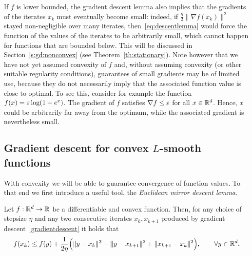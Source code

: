 If $f$ is lower bounded, the gradient descent lemma also implies that the gradients
of the iterates $x_k$ must eventually become small: indeed, if $\frac{\eta}{2}\|\nabla f(x_k)\|^2$ stayed non-negligible over many iterates, then~\eqref{eq:descentlemma} would force the function of the values of the iterates to be arbitrarily small, which cannot happen for functions that are bounded below. This will be discussed in Section~\ref{s:gd:nonconvex} (see Theorem~\ref{th:stationary}). Note however that we have not yet assumed convexity of $f$ and, without
assuming convexity (or other suitable regularity conditions), guarantees of small gradients may be of limited use, because they do not necessarily imply that the associated function value is close to optimal.  To see this, consider for example the function $f(x) = \varepsilon \log(1+e^x)$. The gradient of $f$ satisfies $\nabla f \le \varepsilon$ for all $x \in \mathbb{R}^d$. Hence, $x$ could be arbitrarily far away from the optimum, while the associated gradient is nevertheless small. 

\subsection{Gradient descent for convex $L$-smooth functions}\label{s:gd:convexLsmooth}

With convexity we will be able to guarantee convergence of function values. To that end we first introduce a useful tool, the {\em Euclidean mirror descent lemma}.

\begin{lemma}\label{euclideandescentlemma}
Let $f: \mathbb{R}^d \to \mathbb{R}$ be a differentiable and convex function. Then, for any choice of stepsize $\eta$ and any two consecutive iterates $x_k, x_{k+1}$ produced by gradient descent~\eqref{gradientdescent} it holds that
\begin{equation}\label{eq:mirror1}
f(x_k) \le f(y) + \frac{1}{2\eta} \Big( \|y-x_k\|^2 - \|y-x_{k+1}\|^2  + \|x_{k+1} - x_k\|^2 \Big), \qquad \forall y \in \mathbb{R}^d.
\end{equation}
\end{lemma}

